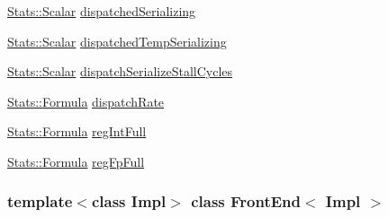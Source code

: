 \begin{DoxyCompactItemize}
\hyperlink{classStats_1_1Scalar}{Stats::Scalar} \hyperlink{classFrontEnd_a02e7f15196d5b571aca2e2fc4636a100}{dispatchedSerializing}
\item 
\hyperlink{classStats_1_1Scalar}{Stats::Scalar} \hyperlink{classFrontEnd_a7d0500ec7ced57d9f111842c84317fa6}{dispatchedTempSerializing}
\item 
\hyperlink{classStats_1_1Scalar}{Stats::Scalar} \hyperlink{classFrontEnd_a0188f971c738223b1be0cac46c0820c0}{dispatchSerializeStallCycles}
\item 
\hyperlink{classStats_1_1Formula}{Stats::Formula} \hyperlink{classFrontEnd_a39e060f97b4d1e11037234f7e2620e2a}{dispatchRate}
\item 
\hyperlink{classStats_1_1Formula}{Stats::Formula} \hyperlink{classFrontEnd_a19af07bae8f9b3d63c68d06893b5a70f}{regIntFull}
\item 
\hyperlink{classStats_1_1Formula}{Stats::Formula} \hyperlink{classFrontEnd_a36fecc5527bb51e9a1c6cc956c167ace}{regFpFull}
\end{DoxyCompactItemize}
\subsubsection*{template$<$class Impl$>$ class FrontEnd$<$ Impl $>$}



